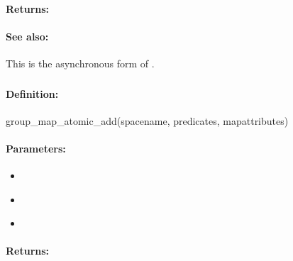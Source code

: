 \paragraph{Returns:}


\paragraph{See also:}  This is the asynchronous form of .

\pagebreak
\subsubsection{}
\label{api:ruby:group_map_atomic_add}


\paragraph{Definition:}
\begin{rubycode}
group_map_atomic_add(spacename, predicates, mapattributes)
\end{rubycode}

\paragraph{Parameters:}
\begin{itemize}[noitemsep]
\item {}\\

\item {}\\

\item {}\\

\end{itemize}

\paragraph{Returns:}


\pagebreak
\subsubsection{}
\label{api:ruby:async_group_map_atomic_add}


